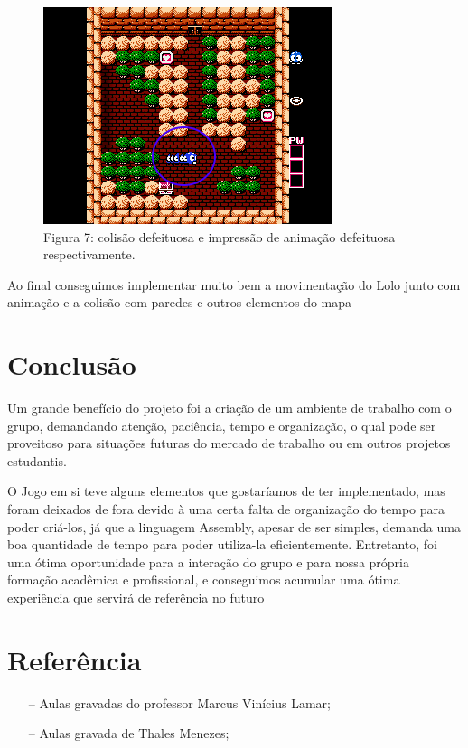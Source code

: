 \documentclass[10pt, conference, compsocconf]{IEEEtran}
\begin{document}
\begin{figure}[htb]
  \begin{center}
   \includegraphics[width=0.3\linewidth]{./Figures/image_10.png}
  \end{center}
  \caption{Figura 7: colisão defeituosa e impressão
de animação defeituosa respectivamente.}
  \label{fig:01}
\end{figure}

Ao final conseguimos implementar muito bem a movimentação do Lolo junto com animação e a colisão com
paredes e outros elementos do mapa

\section{Conclusão}
Um grande benefício do projeto foi a criação de
um ambiente de trabalho com o grupo, demandando
atenção, paciência, tempo e organização, o qual pode
ser proveitoso para situações futuras do mercado de
trabalho ou em outros projetos estudantis.

O Jogo em si teve alguns elementos que
gostaríamos de ter implementado, mas foram deixados de fora devido à uma certa falta de organização do tempo para poder criá-los, já que a linguagem
Assembly, apesar de ser simples, demanda uma boa
quantidade de tempo para poder utiliza-la eficientemente. Entretanto, foi uma ótima oportunidade
para a interação do grupo e para nossa própria formação acadêmica e profissional, e conseguimos acumular uma ótima experiência que servirá de referência no futuro


\section{Referência}
\label{sec:Conclusao}
\begin{itemize}
    \item[--] Aulas gravadas do professor Marcus Vinícius Lamar;
    \item[--] Aulas gravada de Thales Menezes;

\end{itemize}



%
% 
% 
\end{document}
